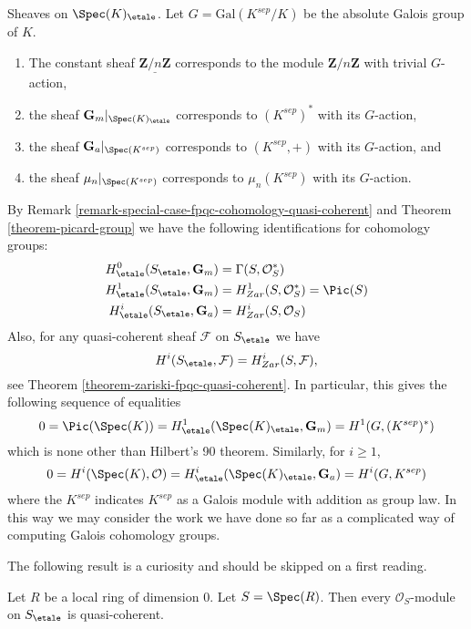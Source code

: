 \begin{example}
\label{example-sheaves-point}
Sheaves on $\Spec(K)_\etale$.
Let $G = \text{Gal}(K^{sep}/K)$ be the absolute Galois group of $K$.
\begin{enumerate}
\item The constant sheaf $\underline{\mathbf{Z}/n\mathbf{Z}}$ corresponds to
the module $\mathbf{Z}/n\mathbf{Z}$ with trivial $G$-action,
\item the sheaf $\mathbf{G}_m|_{\Spec(K)_\etale}$ corresponds to
$(K^{sep})^*$ with its $G$-action,
\item the sheaf $\mathbf{G}_a|_{\Spec(K^{sep})}$ corresponds to
$(K^{sep}, +)$ with its $G$-action, and
\item the sheaf $\mu_n|_{\Spec(K^{sep})}$ corresponds to
$\mu_n(K^{sep})$ with its $G$-action.
\end{enumerate}
By
Remark \ref{remark-special-case-fpqc-cohomology-quasi-coherent}
and
Theorem \ref{theorem-picard-group}
we have the following identifications for cohomology groups:
\begin{align*}
H_\etale^0(S_\etale, \mathbf{G}_m) & =
\Gamma(S, \mathcal{O}_S^*) \\
H_\etale^1(S_\etale, \mathbf{G}_m) & =
H_{Zar}^1(S, \mathcal{O}_S^*) = \Pic(S) \\
H_\etale^i(S_\etale, \mathbf{G}_a) & =
H_{Zar}^i(S, \mathcal{O}_S)
\end{align*}
Also, for any quasi-coherent sheaf $\mathcal{F}$ on $S_\etale$ we have
$$
H^i(S_\etale, \mathcal{F}) = H_{Zar}^i(S, \mathcal{F}),
$$
see
Theorem \ref{theorem-zariski-fpqc-quasi-coherent}.
In particular, this gives the following sequence of equalities
$$
0 =
\Pic(\Spec(K)) =
H_\etale^1(\Spec(K)_\etale, \mathbf{G}_m) =
H^1(G, (K^{sep})^*)
$$
which is none other than Hilbert's 90 theorem. Similarly, for $i \geq 1$,
$$
0 = H^i(\Spec(K), \mathcal{O})
= H_\etale^i(\Spec(K)_\etale, \mathbf{G}_a)
= H^i(G, K^{sep})
$$
where the $K^{sep}$ indicates $K^{sep}$ as a Galois module with addition
as group law. In this way we may consider the work we have done so far as
a complicated way of computing Galois cohomology groups.
\end{example}

\noindent
The following result is a curiosity and should be skipped on a
first reading.

\begin{lemma}
\label{lemma-all-modules-quasi-coherent}
Let $R$ be a local ring of dimension $0$. Let $S = \Spec(R)$.
Then every $\mathcal{O}_S$-module on $S_\etale$ is quasi-coherent.
\end{lemma}

